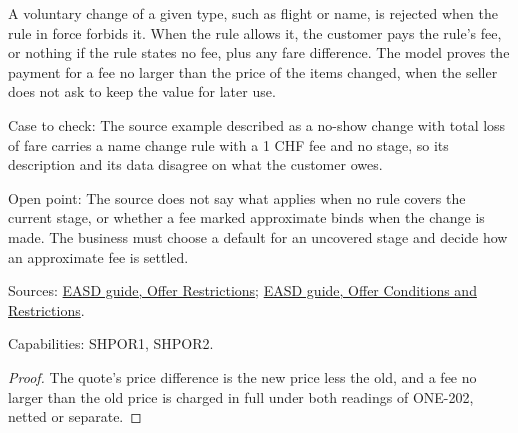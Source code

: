 \begin{theorem}
  \label{thm:offers-change-under-restriction}
  A voluntary change of a given type, such as flight or name, is rejected
  when the rule in force forbids it. When the rule allows it, the customer
  pays the rule's fee, or nothing if the rule states no fee, plus any fare
  difference. The model proves the payment for a fee no larger than the
  price of the items changed, when the seller does not ask to keep the value
  for later use.

  Case to check: The source example described as a no-show change with total
  loss of fare carries a name change rule with a 1 CHF fee and no stage, so
  its description and its data disagree on what the customer owes.

  Open point: The source does not say what applies when no rule covers the
  current stage, or whether a fee marked approximate binds when the change
  is made. The business must choose a default for an uncovered stage and
  decide how an approximate fee is settled.

  Sources: \href{https://standards.atlassian.net/wiki/spaces/EASD/pages/574259692/Offer+Restrictions}{EASD guide, Offer Restrictions};
  \href{https://standards.atlassian.net/wiki/spaces/EASD/pages/574816307/Offer+Conditions+and+Restrictions}{EASD guide, Offer Conditions and Restrictions}.

  Capabilities: SHPOR1, SHPOR2.
\end{theorem}
\begin{proof}
  The quote's price difference is the new price less the old, and a fee no
  larger than the old price is charged in full under both readings of
  ONE-202, netted or separate.
\end{proof}

